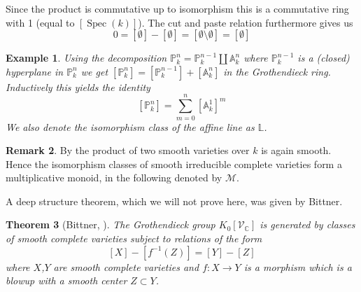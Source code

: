 \documentclass[11pt, a4paper, german]{article}
\theoremstyle{plain}
\newtheorem{theorem}{Theorem}
\newtheorem{example}[theorem]{Example}
\theoremstyle{definition}
\newtheorem{remark}[theorem]{Remark}
\newcommand{\gring}[1][k]{K_0[\mathcal{V}_#1]}
\DeclareMathOperator{\spec}{Spec}
\begin{document}
Since the product is commutative up to isomorphism this is a commutative ring with 1 (equal to $[\spec(k)]$). 
The cut and paste relation furthermore gives us
\[
    0 = [\emptyset] - [\emptyset] = [\emptyset \setminus \emptyset] = [\emptyset]
\]


\begin{example}
    \label{projSum}
    Using the decomposition $\mathbb{P}_k^n = \mathbb{P}_k^{n-1} \coprod \mathbb{A}_k^n$ where $\mathbb{P}_k^{n-1}$ is a (closed) hyperplane
    in $\mathbb{P}_k^n$  we get $[\mathbb{P}_k^n] = [\mathbb{P}_k^{n-1}] + [\mathbb{A}_k^n]$ in the Grothendieck ring.
    Inductively this yields the identity 
    \[
        [\mathbb{P}_k^n] = \sum_{m=0}^n [\mathbb{A}_k^1]^m
    \]
    We also denote the isomorphism class of the affine line as $\mathbb{L}$.
\end{example}

\begin{remark}
    By \cite[Proposition 10.1 (d)]{Ha} the product of two smooth varieties over $k$ is again smooth. Hence the isomorphism classes of smooth
    irreducible complete varieties form a multiplicative monoid, in the following denoted by $\mathcal{M}$.
\end{remark}

A deep structure theorem, which we will not prove here, was given by Bittner.

\begin{theorem}[Bittner, {\cite[Theorem 3.1]{Bittner}}] 
    The Grothendieck group $\gring[\mathbb{C}]$ is generated by classes of smooth complete varieties subject to relations of the form
    \[
        [X] - [f^{-1}(Z)] = [Y] - [Z]
    \]
    where $X$,$Y$ are smooth complete varieties and $f: X \to Y$ is a morphism which is a blowup with a smooth center $Z \subset Y$.
\end{theorem}

\end{document}
